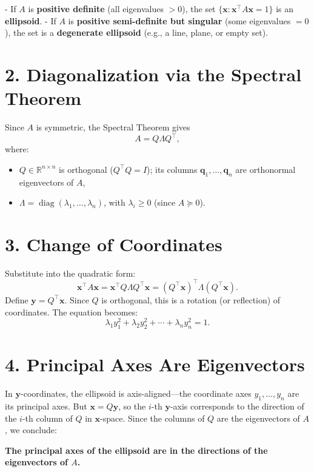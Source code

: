 \documentclass{article}
\begin{document}
- If $ A $ is \textbf{positive definite} (all eigenvalues $ > 0 $), the set $ \{ \mathbf{x} : \mathbf{x}^\top A \mathbf{x} = 1 \} $ is an \textbf{ellipsoid}.
- If $ A $ is \textbf{positive semi-definite but singular} (some eigenvalues $ = 0 $), the set is a \textbf{degenerate ellipsoid} (e.g., a line, plane, or empty set).

\section*{2. Diagonalization via the Spectral Theorem}

Since $ A $ is symmetric, the Spectral Theorem gives
\[
A = Q \Lambda Q^\top,
\]
where:
\begin{itemize}
\item $ Q \in \mathbb{R}^{n \times n} $ is orthogonal ($ Q^\top Q = I $); its columns $ \mathbf{q}_1, \dots, \mathbf{q}_n $ are orthonormal eigenvectors of $ A $,
    \item $ \Lambda = \operatorname{diag}(\lambda_1, \dots, \lambda_n) $, with $ \lambda_i \geq 0 $ (since $ A \succeq 0 $).
\end{itemize}

\section*{3. Change of Coordinates}

Substitute into the quadratic form:
\[
\mathbf{x}^\top A \mathbf{x} = \mathbf{x}^\top Q \Lambda Q^\top \mathbf{x} = (Q^\top \mathbf{x})^\top \Lambda (Q^\top \mathbf{x}).
\]
Define $ \mathbf{y} = Q^\top \mathbf{x} $. Since $ Q $ is orthogonal, this is a rotation (or reflection) of coordinates.  
The equation becomes:
\[
\lambda_1 y_1^2 + \lambda_2 y_2^2 + \cdots + \lambda_n y_n^2 = 1.
\]

\section*{4. Principal Axes Are Eigenvectors}

In $ \mathbf{y} $-coordinates, the ellipsoid is axis-aligned—the coordinate axes $ y_1, \dots, y_n $ are its principal axes.  
But $ \mathbf{x} = Q \mathbf{y} $, so the $ i $-th $ \mathbf{y} $-axis corresponds to the direction of the $ i $-th column of $ Q $ in $ \mathbf{x} $-space.  
Since the columns of $ Q $ are the eigenvectors of $ A $, we conclude:

\begin{center}
\textbf{The principal axes of the ellipsoid are in the directions of the eigenvectors of $ A $.}
\end{center}
\end{document}
